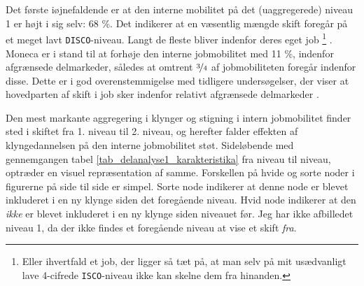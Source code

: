 % 
\begin{table}[H] \centering
\caption{Karakteristika for segmenteringsprocessen}
\label{tab_delanalyse1_karakteristika}
\end{table}
%

Det første iøjnefaldende er at den interne mobilitet på det (uaggregerede) niveau 1 er højt i sig selv: 68 \%. Det indikerer at en væsentlig mængde skift foregår på et meget lavt \texttt{DISCO}-niveau. Langt de fleste bliver indenfor deres eget job%
%
\footnote{Eller ihvertfald et job, der ligger så tæt på, at man selv på mit usædvanligt lave 4-cifrede \texttt{ISCO}-niveau ikke kan skelne dem fra hinanden.}%
%
. Moneca er i stand til at forhøje den interne jobmobilitet med 11 \%, indenfor afgrænsede delmarkeder, således at omtrent $\nicefrac{3}{4}$ af jobmobiliteten foregår indenfor disse. Dette er i god overenstemmigelse med tidligere undersøgelser, der viser at hovedparten af skift i job sker indenfor relativt afgrænsede delmarkeder \parencite[124]{BojeToft1989}. 


Den mest markante aggregering i klynger og stigning i intern jobmobilitet finder sted i skiftet fra 1. niveau til 2. niveau, og herefter falder effekten af klyngedannelsen på den interne jobmobilitet støt. Sideløbende med gennemgangen tabel \ref{tab_delanalyse1_karakteristika} fra niveau til niveau, optræder en visuel repræsentation af samme. Forskellen på hvide og sorte noder i figurerne på side \pageref{fig_delanalyse1_kort_seg_proces2} til side \pageref{fig_delanalyse1_kort_seg_proces5} er simpel. Sorte node indikerer at denne node er blevet inkluderet i en ny klynge siden det foregående niveau. Hvid node indikerer at den \emph{ikke} er blevet inkluderet i en ny klynge siden niveauet før. 
Jeg har ikke afbilledet niveau 1, da der ikke findes et foregående niveau at vise et skift \emph{fra}. 

